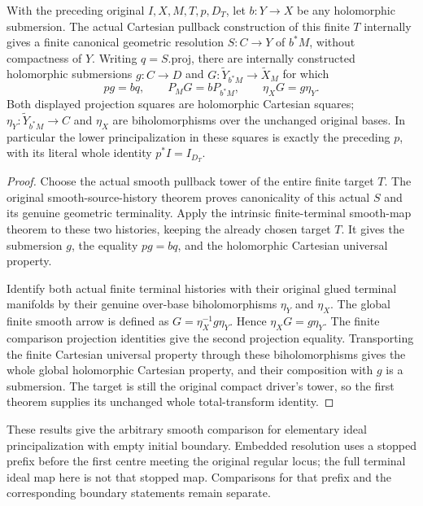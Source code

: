 \begin{theorem}
\label{hir:original-canonical-elementary-principalization-smooth}
\leanok
{}
With the preceding original $I,X,M,T,p,D_T$, let $b:Y\to X$ be any
holomorphic submersion.  The actual Cartesian pullback construction of
this finite $T$ internally gives a finite canonical geometric resolution
$S:C\to Y$ of $b^*M$, without compactness of $Y$.  Writing $q=S.\mathrm{proj}$,
there are internally constructed holomorphic submersions
$g:C\to D$ and $G:\widetilde Y_{b^*M}\to\widetilde X_M$ for which
\[
 pg=bq,\qquad P_MG=bP_{b^*M},\qquad
 \eta_XG=g\eta_Y .
\]
Both displayed projection squares are holomorphic Cartesian squares;
$\eta_Y:\widetilde Y_{b^*M}\to C$ and $\eta_X$ are biholomorphisms over
the unchanged original bases.  In particular the lower principalization
in these squares is exactly the preceding $p$, with its literal whole
identity $p^*I=I_{D_T}$.
\end{theorem}
\begin{proof}
Choose the actual smooth pullback tower of the entire finite target $T$.
The original smooth-source-history theorem proves canonicality of this
actual $S$ and its genuine geometric terminality.  Apply the intrinsic
finite-terminal smooth-map theorem to these two histories, keeping the
already chosen target $T$.  It gives the submersion $g$, the equality
$pg=bq$, and the holomorphic Cartesian universal property.

Identify both actual finite terminal histories with their original glued
terminal manifolds by their genuine over-base biholomorphisms $\eta_Y$
and $\eta_X$.  The global finite smooth arrow is defined as
$G=\eta_X^{-1}g\eta_Y$.  Hence $\eta_XG=g\eta_Y$.  The finite comparison
projection identities give the second projection equality.  Transporting
the finite Cartesian universal property through these biholomorphisms
gives the whole global holomorphic Cartesian property, and their
composition with $g$ is a submersion.  The target is still the original
compact driver's tower, so the first theorem supplies its unchanged whole
total-transform identity.
\end{proof}

\begin{remark}
These results give the arbitrary smooth comparison for elementary ideal
principalization with empty initial boundary.  Embedded resolution uses a
stopped prefix before the first centre meeting the original regular locus;
the full terminal ideal map here is not that stopped map.  Comparisons for
that prefix and the corresponding boundary statements remain separate.
\end{remark}
